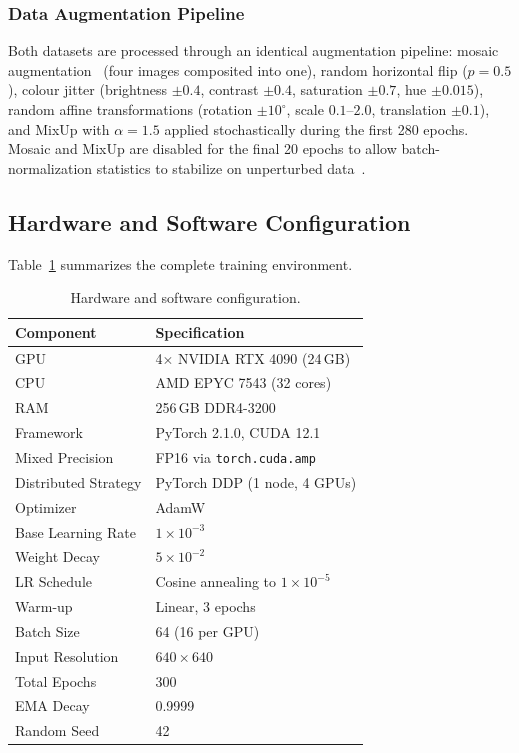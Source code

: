 \subsubsection{Data Augmentation Pipeline}

Both datasets are processed through an identical augmentation
pipeline: mosaic augmentation~\cite{bochkovskiy2020yolov4}
(four images composited into one), random horizontal flip
($p = 0.5$), colour jitter (brightness $\pm 0.4$, contrast
$\pm 0.4$, saturation $\pm 0.7$, hue $\pm 0.015$), random
affine transformations (rotation $\pm 10^{\circ}$, scale
$0.1$--$2.0$, translation $\pm 0.1$), and MixUp
\cite{zhang2018mixup} with $\alpha = 1.5$ applied
stochastically during the first 280 epochs.  Mosaic and MixUp
are disabled for the final 20 epochs to allow batch-normalization
statistics to stabilize on unperturbed data~\cite{ge2021yolox}.

\subsection{Hardware and Software Configuration}

Table~\ref{tab:hw_sw} summarizes the complete training
environment.

\begin{table}[!t]
\centering
\caption{Hardware and software configuration.}
\label{tab:hw_sw}
\renewcommand{\arraystretch}{1.15}
\setlength{\tabcolsep}{4pt}
\begin{tabular}{l l}
\hline\hline
\textbf{Component}      & \textbf{Specification} \\
\hline
GPU                      & 4$\times$ NVIDIA RTX 4090 (24\,GB) \\
CPU                      & AMD EPYC 7543 (32 cores) \\
RAM                      & 256\,GB DDR4-3200 \\
Framework                & PyTorch 2.1.0, CUDA 12.1 \\
Mixed Precision          & FP16 via \texttt{torch.cuda.amp} \\
Distributed Strategy     & PyTorch DDP (1 node, 4 GPUs) \\
\hline
Optimizer                & AdamW~\cite{loshchilov2019decoupled} \\
Base Learning Rate       & $1 \times 10^{-3}$ \\
Weight Decay             & $5 \times 10^{-2}$ \\
LR Schedule              & Cosine annealing to $1 \times 10^{-5}$ \\
Warm-up                  & Linear, 3 epochs \\
Batch Size               & 64 (16 per GPU) \\
Input Resolution         & $640 \times 640$ \\
Total Epochs             & 300 \\
EMA Decay                & 0.9999 \\
Random Seed              & 42 \\
\hline\hline
\end{tabular}
\end{table}

